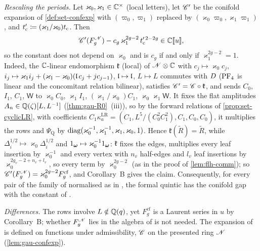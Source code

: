 \emph{Rescaling the periods.} Let $\varkappa_0,\varkappa_1\in\mathbb{C}^\times$ (local letters), let $\mathscr{C}'$ be the conifold expansion of \cref{def:set-confexp} with $(\varpi_0,\varpi_1)$ replaced by $(\varkappa_0\varpi_0,\varkappa_1\varpi_1)$, and $t_{\mathrm{c}}'\coloneqq(\varkappa_1/\varkappa_0)t_{\mathrm{c}}$. Then
\[
\mathscr{C}'(F_g^{\mathscr{N}})-c_g\,\varkappa_1^{2g-2}\,t_{\mathrm{c}}'^{\,2-2g}\in\mathbb{C}[\![ u ]\!],
\]
so the constant does not depend on $\varkappa_0$ and is $c_g$ if and only if $\varkappa_1^{2g-2}=1$. Indeed, the $\mathbb{C}$-linear endomorphism $\mathfrak k$ (local) of $\mathscr{N}\otimes\mathbb{C}$ with $c_j\mapsto\varkappa_0c_j$, $i_j\mapsto\varkappa_1i_j+(\varkappa_1-\varkappa_0)(\mathfrak{l}\,c_j+jc_{j-1})$, $\mathfrak{l}\mapsto\mathfrak{l}$, $L\mapsto L$ commutes with $D$ ($\mathrm{PF}_{4}$ is linear and the concomitant relation bilinear), satisfies $\mathscr{C}'=\mathscr{C}\circ\mathfrak k$, and sends $C_0$, $I_1$, $C_1$, $\mathsf W$ to $\varkappa_0C_0$, $\varkappa_1I_1$, $(\varkappa_1/\varkappa_0)C_1$, $\varkappa_0\varkappa_1\mathsf W$. It fixes the flat amplitudes $A_n\in\mathbb{Q}(\zeta)[L,L^{-1}]$ (\cref{thm:gau-R0}~(iii)), so by the forward relations of \cref{prop:set-cyclicLR}, with coefficients $C_1\kappa^{\mathrm{LR}}_a=(C_1,L^5/(C_0^2C_1^2),C_1,C_0,C_0)$, it multiplies the rows and $\Psi_{\mathrm Q}$ by $\operatorname{diag}(\varkappa_0^{-1},\varkappa_1^{-1},\varkappa_1,\varkappa_0,1)$. Hence $\mathfrak k(\tilde R)=\tilde R$, while $\Delta_i^{1/2}\mapsto\varkappa_0\Delta_i^{1/2}$ and $1_{\boldsymbol{\omega}}\mapsto\varkappa_0^{-1}1_{\boldsymbol{\omega}}$: $\mathfrak k$ fixes the edges, multiplies every leaf insertion by $\varkappa_0^{-1}$ and every vertex with $n_v$ half-edges and $l_v$ leaf insertions by $\varkappa_0^{2g_v-2+n_v+l_v}$, so every term by $\varkappa_0^{2g-2}$ (as in the proof of \cref{lem:flh-comm}); so $\mathscr{C}'(F_g^{\mathscr{N}})=\varkappa_0^{2g-2}F_g^{\mathrm{cf}}$, and Corollary~B gives the claim. Consequently, for every pair of the family of \cite[Rem.~1.4]{CGYZ26} normalised as in \cite[Prop.-Def.~4.5\,(1)]{CGYZ26}, the formal quintic has the conifold gap with the constant of \cite[Conj.~1.5]{CGYZ26}.

\emph{Differences.} The rows involve $L\notin\mathbb{Q}(q)$, yet $F_g^{\mathrm{cf}}$ is a Laurent series in $u$ by Corollary~B; whether $F_g^{\mathscr{N}}$ lies in the algebra of \cite[Def.~1.1]{CGYZ26} is not needed. The expansion of \cite{CGYZ26} is defined on functions under admissibility, $\mathscr{C}$ on the presented ring $\mathscr{N}$ (\cref{lem:gau-confexp}).
